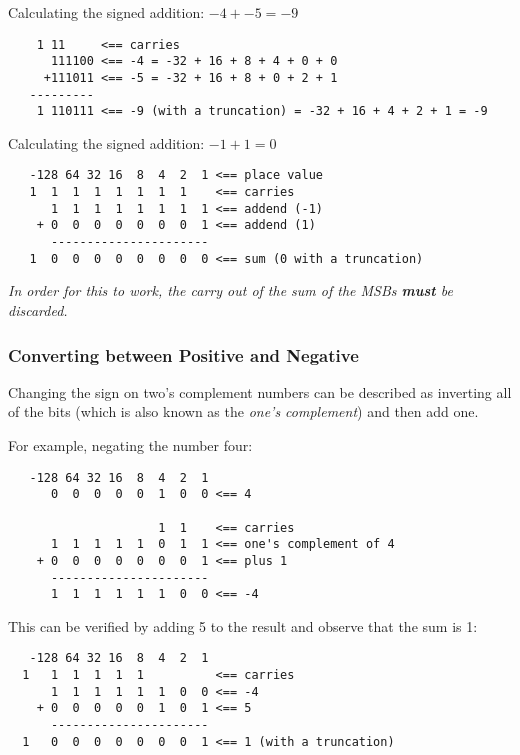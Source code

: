 Calculating the signed addition: $-4+ -5 = -9$

\begin{verbatim}
    1 11     <== carries
      111100 <== -4 = -32 + 16 + 8 + 4 + 0 + 0
     +111011 <== -5 = -32 + 16 + 8 + 0 + 2 + 1
   ---------
    1 110111 <== -9 (with a truncation) = -32 + 16 + 4 + 2 + 1 = -9
\end{verbatim}


Calculating the signed addition: $-1+1=0$

\begin{verbatim}
   -128 64 32 16  8  4  2  1 <== place value
   1  1  1  1  1  1  1  1    <== carries
      1  1  1  1  1  1  1  1 <== addend (-1)
    + 0  0  0  0  0  0  0  1 <== addend (1)
      ----------------------
   1  0  0  0  0  0  0  0  0 <== sum (0 with a truncation)
\end{verbatim}

{\em In order for this to work, the carry out of the sum of the MSBs {\bfseries must} be discarded.}

\subsubsection{Converting between Positive and Negative}

Changing the sign on two's complement numbers can be described as
inverting all of the bits (which is also known as the {\em one's complement})
and then add one.

For example, negating the number four:

\begin{minipage}{\textwidth}
\begin{verbatim}
   -128 64 32 16  8  4  2  1
      0  0  0  0  0  1  0  0 <== 4

                     1  1    <== carries
      1  1  1  1  1  0  1  1 <== one's complement of 4
    + 0  0  0  0  0  0  0  1 <== plus 1
      ----------------------
      1  1  1  1  1  1  0  0 <== -4
\end{verbatim}
\end{minipage}

This can be verified by adding 5 to the result and observe that
the sum is 1:

\begin{verbatim}
   -128 64 32 16  8  4  2  1
  1   1  1  1  1  1          <== carries
      1  1  1  1  1  1  0  0 <== -4
    + 0  0  0  0  0  1  0  1 <== 5
      ----------------------
  1   0  0  0  0  0  0  0  1 <== 1 (with a truncation)
\end{verbatim}


